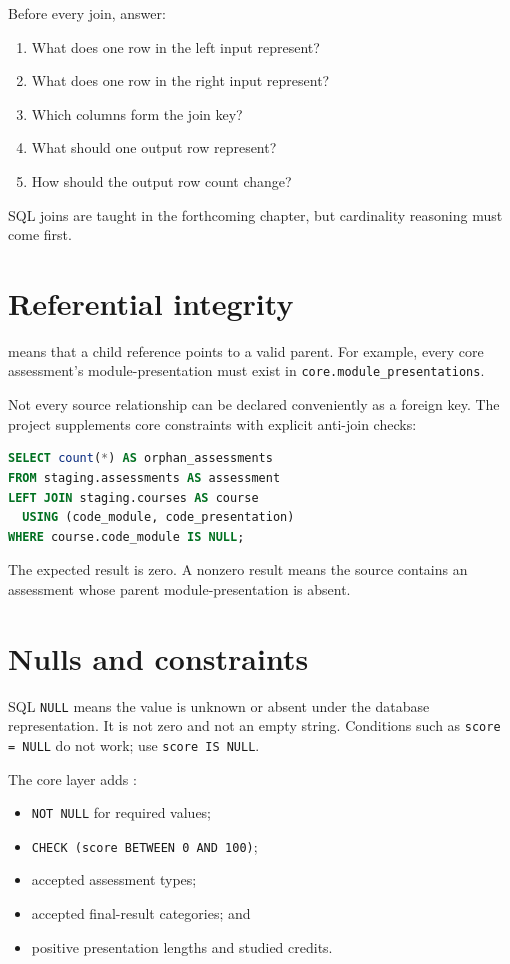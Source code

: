 Before every join, answer:
\begin{enumerate}
  \item What does one row in the left input represent?
  \item What does one row in the right input represent?
  \item Which columns form the join key?
  \item What should one output row represent?
  \item How should the output row count change?
\end{enumerate}

SQL joins are taught in the forthcoming chapter, but cardinality reasoning must
come first.

\section{Referential integrity}

 means that a child reference points to a valid
parent. For example, every core assessment's module-presentation must exist in
\texttt{core.module\_presentations}.

Not every source relationship can be declared conveniently as a foreign key.
The project supplements core constraints with explicit anti-join checks:

\begin{lstlisting}[language=SQL,caption={Conceptual form of the implemented
orphan-assessment check.}]
SELECT count(*) AS orphan_assessments
FROM staging.assessments AS assessment
LEFT JOIN staging.courses AS course
  USING (code_module, code_presentation)
WHERE course.code_module IS NULL;
\end{lstlisting}

The expected result is zero. A nonzero result means the source contains an
assessment whose parent module-presentation is absent.

\section{Nulls and constraints}

SQL \texttt{NULL} means the value is unknown or absent under the database
representation. It is not zero and not an empty string. Conditions such as
\texttt{score = NULL} do not work; use \texttt{score IS NULL}.

The core layer adds :
\begin{itemize}
  \item \texttt{NOT NULL} for required values;
  \item \texttt{CHECK (score BETWEEN 0 AND 100)};
  \item accepted assessment types;
  \item accepted final-result categories; and
  \item positive presentation lengths and studied credits.
\end{itemize}

